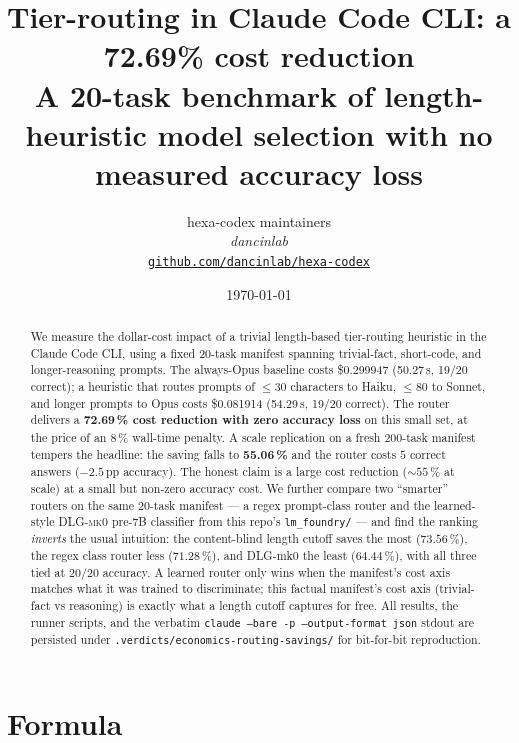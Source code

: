 \documentclass[11pt,a4paper]{article}
\title{
  \textbf{Tier-routing in Claude Code CLI: a 72.69\% cost reduction}\\[4pt]
  \large A 20-task benchmark of length-heuristic model selection
  with no measured accuracy loss
}
\author{
  hexa-codex maintainers\\
  \normalsize\textit{dancinlab}\\[2pt]
  \normalsize\href{https://github.com/dancinlab/hexa-codex}{\texttt{github.com/dancinlab/hexa-codex}}
}
\date{\today}
\begin{document}
\maketitle

\begin{abstract}
We measure the dollar-cost impact of a trivial length-based tier-routing
heuristic in the Claude Code CLI, using a fixed 20-task manifest spanning
trivial-fact, short-code, and longer-reasoning prompts. The always-Opus
baseline costs \$0.299947 (50.27\,s, 19/20 correct); a heuristic that
routes prompts of $\le 30$ characters to Haiku, $\le 80$ to Sonnet, and
longer prompts to Opus costs \$0.081914 (54.29\,s, 19/20 correct). The
router delivers a \textbf{72.69\,\% cost reduction with zero accuracy
loss} on this small set, at the price of an 8\,\% wall-time penalty.
A scale replication on a fresh 200-task manifest tempers the headline:
the saving falls to \textbf{55.06\,\%} and the router costs $5$ correct
answers ($-2.5\,$pp accuracy). The honest claim is a large cost
reduction ($\sim 55\,\%$ at scale) at a small but non-zero accuracy
cost. We further compare two ``smarter'' routers on the same 20-task
manifest --- a regex prompt-class router and the learned-style
\textsc{DLG-mk0} pre-7B classifier from this repo's
\texttt{lm\_foundry/} --- and find the ranking \emph{inverts} the usual
intuition: the content-blind length cutoff saves the most
($73.56\,\%$), the regex class router less ($71.28\,\%$), and DLG-mk0
the least ($64.44\,\%$), with all three tied at $20/20$ accuracy. A
learned router only wins when the manifest's cost axis matches what it
was trained to discriminate; this factual manifest's cost axis
(trivial-fact vs reasoning) is exactly what a length cutoff captures
for free. All results, the runner scripts, and the verbatim
\texttt{claude --bare -p --output-format json} stdout are persisted under
\texttt{.verdicts/economics-routing-savings/} for bit-for-bit reproduction.
\end{abstract}

\section{Formula}
\label{sec:formula}
\end{document}
